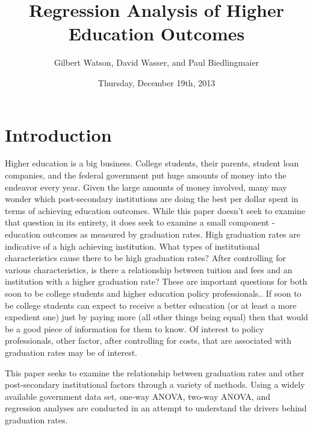 \documentclass{article}
\begin{document}


\title{Regression Analysis of Higher Education Outcomes}
\author{Gilbert Watson, David Wasser, and Paul Biedlingmaier}
\date{Thursday, December 19th, 2013}





\maketitle
\tableofcontents

\section{Introduction}

Higher education is a big business. College students, their parents, student loan companies, and the federal government put huge amounts of money into the endeavor every year. Given the large amounts of money involved, many may wonder which post-secondary institutions are doing the best per dollar spent in terms of achieving education outcomes. While this paper doesn't seek to examine that question in its entirety, it does seek to examine a small component - education outcomes as measured by graduation rates. High graduation rates are indicative of a high achieving institution. What types of institutional characteristics cause there to be high graduation rates? After controlling for various characteristics, is there a relationship between tuition and fees and an institution with a higher graduation rate? These are important questions for both soon to be college students and higher education policy professionals.. If soon to be college students can expect to receive a better education (or at least a more expedient one) just by paying more (all other things being equal) then that would be a good piece of information for them to know. Of interest to policy professionals, other factor, after controlling for costs, that are associated with graduation rates may be of interest.

This paper seeks to examine the relationship between graduation rates and other post-secondary institutional factors through a variety of methods. Using a widely available government data set, one-way ANOVA, two-way ANOVA, and regression analyses are conducted  in an attempt to understand the drivers behind graduation rates.
\end{document}
